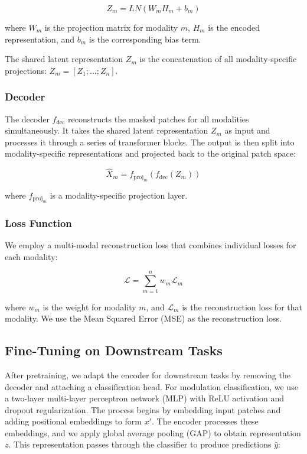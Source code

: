 \begin{equation}
Z_m = LN(W_m H_m + b_m)
\end{equation}

where $W_m$ is the projection matrix for modality $m$, $H_m$ is the encoded representation, and $b_m$ is the corresponding bias term.

The shared latent representation $Z_m$ is the concatenation of all modality-specific projections:
$Z_m = [Z_1; ...; Z_n]$.

\subsubsection{Decoder}

The decoder $f_{\textrm{dec}}$ reconstructs the masked patches for all modalities simultaneously. It takes the shared latent representation $Z_m$ as input and processes it through a series of transformer blocks. The output is then split into modality-specific representations and projected back to the original patch space:

\begin{equation}
\hat{X}_m = f_{\textrm{proj}_m}(f_{\textrm{dec}}(Z_m))
\end{equation}

where $f_{\textrm{proj}_m}$ is a modality-specific projection layer.

\subsubsection{Loss Function}

We employ a multi-modal reconstruction loss that combines individual losses for each modality:

\begin{equation}
\mathcal{L} = \sum_{m=1}^n w_m \mathcal{L}_m
\end{equation}

where $w_m$ is the weight for modality $m$, and $\mathcal{L}_m$ is the reconstruction loss for that modality. We use the Mean Squared Error (MSE) as the reconstruction loss.

\subsection{Fine-Tuning on Downstream Tasks}

After pretraining, we adapt the encoder for downstream tasks by removing the decoder and attaching a classification head. For modulation classification, we use a two-layer multi-layer perceptron network (MLP) with ReLU activation and dropout regularization. The process begins by embedding input patches and adding positional embeddings to form $x'$. The encoder processes these embeddings, and we apply global average pooling (GAP) to obtain representation $z$. This representation passes through the classifier to produce predictions $\hat{y}$:


